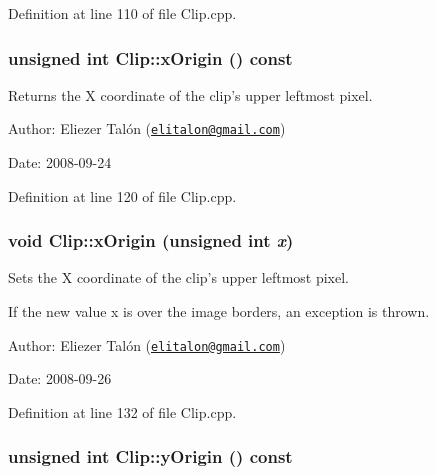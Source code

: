 Definition at line 110 of file Clip.cpp.\hypertarget{class_clip_6965fb65870eeb239c8a829444bb4ed7}{
\subsubsection[xOrigin]{\setlength{\rightskip}{0pt plus 5cm}unsigned int Clip::xOrigin () const}}
\label{class_clip_6965fb65870eeb239c8a829444bb4ed7}


Returns the X coordinate of the clip's upper leftmost pixel. 

\begin{Desc}
\item[Author:]Eliezer Talón (\href{mailto:elitalon@gmail.com}{\tt elitalon@gmail.com}) \end{Desc}
\begin{Desc}
\item[Date:]2008-09-24 \end{Desc}


Definition at line 120 of file Clip.cpp.\hypertarget{class_clip_59bed794f674858a9ca02fce36c58fac}{
\subsubsection[xOrigin]{\setlength{\rightskip}{0pt plus 5cm}void Clip::xOrigin (unsigned int {\em x})}}
\label{class_clip_59bed794f674858a9ca02fce36c58fac}


Sets the X coordinate of the clip's upper leftmost pixel. 

If the new value x is over the image borders, an exception is thrown.

\begin{Desc}
\item[Author:]Eliezer Talón (\href{mailto:elitalon@gmail.com}{\tt elitalon@gmail.com}) \end{Desc}
\begin{Desc}
\item[Date:]2008-09-26 \end{Desc}


Definition at line 132 of file Clip.cpp.\hypertarget{class_clip_6023296db25d263b311900cafb7cc55d}{
\subsubsection[yOrigin]{\setlength{\rightskip}{0pt plus 5cm}unsigned int Clip::yOrigin () const}}
\label{class_clip_6023296db25d263b311900cafb7cc55d}


